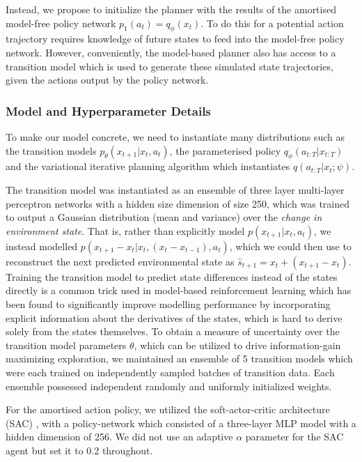 Instead, we propose to initialize the planner with the results of the amortised model-free policy network $p_1(a_t) = q_\phi(x_t)$. To do this for a potential action trajectory requires knowledge of future states to feed into the model-free policy network. However, conveniently, the model-based planner also has access to a transition model which is used to generate these simulated state trajectories, given the actions output by the policy network. 

\subsubsection{Model and Hyperparameter Details}

To make our model concrete, we need to instantiate many distributions such as the transition models $p_\theta(x_{t+1} | x_t, a_t)$, the parameterised policy $q_\phi(a_{t:T} | x_{t:T})$ and the variational iterative planning algorithm which instantiates $q(a_{t:T} | x_t; \psi)$.

The transition model was instantiated as an ensemble of three layer multi-layer perceptron networks with a hidden size dimension of size 250, which was trained to output a Gaussian distribution (mean and variance) over the \emph{change in environment state}. That is, rather than explicitly model $p(x_{t+1} |x_t, a_t)$, we instead modelled $p(x_{t+1} - x_t | x_t, (x_t - x_{t-1}), a_t)$, which we could then use to reconstruct the next predicted environmental state as $\hat{s}_{t+1} = x_t + (x_{t+1} - x_t)$. Training the transition model to predict state differences instead of the states directly is a common trick used in model-based reinforcement learning which has been found to significantly improve modelling performance by incorporating explicit information about the derivatives of the states, which is hard to derive solely from the states themselves. To obtain a measure of uncertainty over the transition model parameters $\theta$, which can be utilized to drive information-gain maximizing exploration, we maintained an ensemble of 5 transition models which were each trained on independently sampled batches of transition data. Each ensemble possessed independent randomly and uniformly initialized weights.

For the amortised action policy, we utilized the soft-actor-critic architecture (SAC) \citep{haarnoja2018soft}, with a policy-network which consisted of a three-layer MLP model with a hidden dimension of 256. We did not use an adaptive $\alpha$ parameter for the SAC agent but set it to 0.2 throughout.

